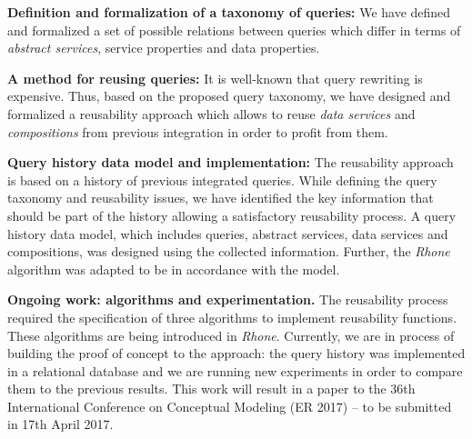 \bigskip
\noindent \textbf{Definition and formalization of a taxonomy of queries:}
We have defined and formalized a set of possible relations between queries which differ in terms of \textsl{abstract services}, service properties and data properties.

\bigskip
\noindent \textbf{A method for reusing queries:}
It is well-known that query rewriting is expensive. Thus, based on the proposed query taxonomy, we have designed and formalized a reusability approach which allows to reuse \textsl{data services} and \textsl{compositions} from previous integration in order to profit from them.

\bigskip
\noindent \textbf{Query history data model and implementation:}
The reusability approach is based on a history of previous integrated queries. While defining the query taxonomy and reusability issues, we have identified the key information that should be part of the history allowing a satisfactory reusability process. A query history data model, which includes queries, abstract services, data services and compositions, was designed using the collected information. Further, the \textsl{Rhone} algorithm was adapted to be in accordance with the model.

\bigskip
\noindent \textbf{Ongoing work: algorithms and experimentation.}
The reusability process required the specification of three algorithms to implement reusability functions. These algorithms are being introduced in \textit{Rhone}. Currently, we are in process of building the proof of concept to the approach: the query history was implemented in a relational database and we are running new experiments in order to compare them to the previous results. This work will result in a paper to the 36th International Conference on Conceptual Modeling (ER 2017) -- to be submitted in 17th April 2017.